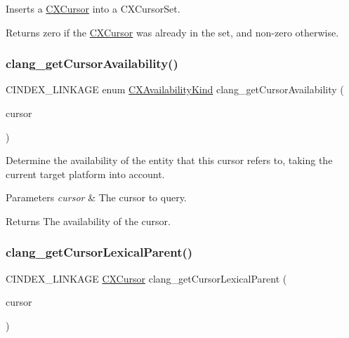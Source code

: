 Inserts a \mbox{\hyperlink{structCXCursor}{C\+X\+Cursor}} into a C\+X\+Cursor\+Set. 

\begin{DoxyReturn}{Returns}
zero if the \mbox{\hyperlink{structCXCursor}{C\+X\+Cursor}} was already in the set, and non-\/zero otherwise. 
\end{DoxyReturn}
\mbox{\label{group__CINDEX__CURSOR__MANIP_gab44e2a565fa40a0e0fc0f130f618a9b5}} 
\subsubsection{\texorpdfstring{clang\+\_\+get\+Cursor\+Availability()}{clang\_getCursorAvailability()}}
{\footnotesize\ttfamily C\+I\+N\+D\+E\+X\+\_\+\+L\+I\+N\+K\+A\+GE enum \mbox{\hyperlink{group__CINDEX_gada331ea0195e952c8f181ecf15e83d71}{C\+X\+Availability\+Kind}} clang\+\_\+get\+Cursor\+Availability (\begin{DoxyParamCaption}\item[{\mbox{\hyperlink{structCXCursor}{C\+X\+Cursor}}}]{cursor }\end{DoxyParamCaption})}



Determine the availability of the entity that this cursor refers to, taking the current target platform into account. 


\begin{DoxyParams}{Parameters}
{\em cursor} & The cursor to query.\\
\hline
\end{DoxyParams}
\begin{DoxyReturn}{Returns}
The availability of the cursor. 
\end{DoxyReturn}
\mbox{\label{group__CINDEX__CURSOR__MANIP_gace7a423874d72b3fdc71d6b0f31830dd}} 
\subsubsection{\texorpdfstring{clang\+\_\+get\+Cursor\+Lexical\+Parent()}{clang\_getCursorLexicalParent()}}
{\footnotesize\ttfamily C\+I\+N\+D\+E\+X\+\_\+\+L\+I\+N\+K\+A\+GE \mbox{\hyperlink{structCXCursor}{C\+X\+Cursor}} clang\+\_\+get\+Cursor\+Lexical\+Parent (\begin{DoxyParamCaption}\item[{\mbox{\hyperlink{structCXCursor}{C\+X\+Cursor}}}]{cursor }\end{DoxyParamCaption})}



